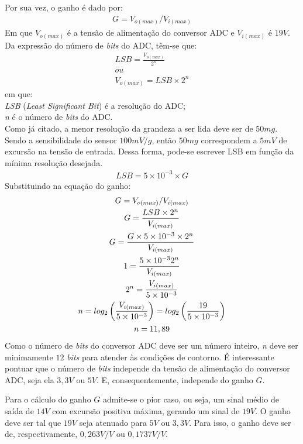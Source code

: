 \documentclass[11pt]{abntex2}
\begin{document}
				Por sua vez, o ganho é dado por:
				\begin{gather*}
					G = V_{o(max)}/V_{i(max)}
				\end{gather*}
				Em que $V_{o(max)}$ é a tensão de alimentação do conversor ADC e $V_{i(max)}$ é
				$19V$. Da expressão do número de \textit{bits} do ADC, têm-se que:
				\begin{gather*}
					LSB = \frac{V_{o(max)}}{2^n}\\
					ou\\
					V_{o(max)} = LSB\times 2^n
				\end{gather*}
				em que:\\
				\textit{LSB} (\textit{Least Significant Bit}) é a resolução do ADC;\\
				\textit{n} é o número de \textit{bits} do ADC.\\
				
				Como já citado, a menor resolução da grandeza a ser lida deve ser de
				$50mg$. Sendo a sensibilidade do sensor $100mV/g$, então $50mg$
				correspondem a $5mV$ de excursão na tensão de entrada. Dessa forma,
				pode-se escrever LSB em função da mínima resolução desejada.
				\begin{gather*}
					LSB = 5\times 10^{-3}\times G
				\end{gather*}
				Substituindo na equação do ganho:
				\begin{gather*}
					G = V_{o(max)}/V_{i(max)}\\
					G = \frac{LSB\times 2^n}{V_{i(max)}}\\
					G = \frac{G\times 5\times 10^{-3}\times 2^n}{V_{i(max)}}\\
					1 = \frac{5\times 10^{-3}\*2^n}{V_{i(max)}}\\
					2^n = \frac{V_{i(max)}}{5\times 10^{-3}}\\
					n = log_2\left( \frac{V_{i(max)}}{5\times 10^{-3}} \right) = log_2\left( \frac{19}{5\times 10^{-3}}\right)\\
					n = 11,89
				\end{gather*}
				Como o número de \textit{bits} do conversor ADC deve ser um número inteiro, \textit{n}
				deve ser minimamente $12$ \textit{bits} para atender às condições de contorno. É
				interessante pontuar que o número de \textit{bits} independe da tensão de
				alimentação do conversor ADC, seja ela $3,3V$ ou $5V$. E, consequentemente,
				independe do ganho $G$.
				
				Para o cálculo do ganho $G$ admite-se o pior caso, ou seja, um sinal médio
				de saída de $14V$ com excursão positiva máxima, gerando um sinal de $19V$. O
				ganho deve ser tal que $19V$ seja atenuado para $5V$ ou $3,3V$. Para isso, o
				ganho deve ser de, respectivamente, $0,263V/V$ ou $0,1737V/V$.
\end{document}

